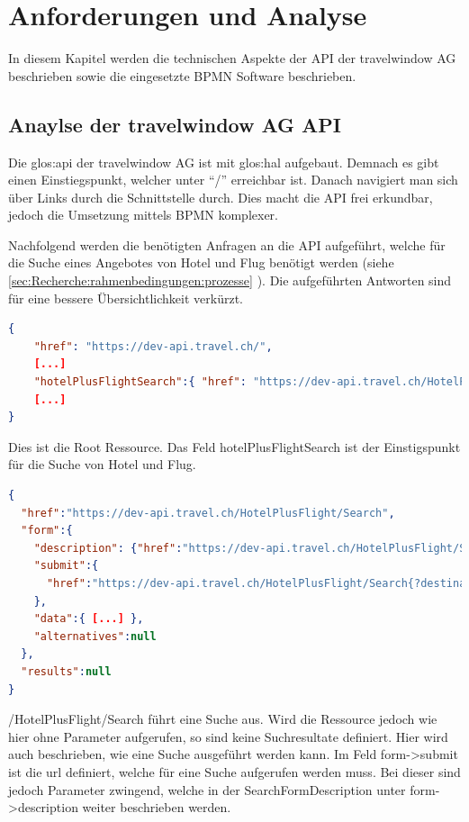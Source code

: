 

\chapter{Anforderungen und Analyse}
\label{sec:analyse}
In diesem Kapitel werden die technischen Aspekte der API der travelwindow AG beschrieben sowie die eingesetzte BPMN Software beschrieben.

\section{Anaylse der travelwindow AG API}
\label{sec:analyse:api}
Die \Gls{glos:api} der travelwindow AG ist mit \Gls{glos:hal} aufgebaut. Demnach es gibt einen Einstiegspunkt, welcher unter "`/"' erreichbar ist. Danach navigiert man sich über Links durch die Schnittstelle durch. Dies macht die API frei erkundbar, jedoch die Umsetzung mittels BPMN komplexer.

Nachfolgend werden die benötigten Anfragen an die API aufgeführt, welche für die Suche eines Angebotes von Hotel und Flug benötigt werden (siehe \cref{sec:Recherche:rahmenbedingungen:prozesse} ). Die aufgeführten Antworten sind für eine bessere Übersichtlichkeit verkürzt.


\begin{lstlisting}[language=json,firstnumber=1]
{
	"href": "https://dev-api.travel.ch/",
	[...]
	"hotelPlusFlightSearch":{ "href": "https://dev-api.travel.ch/HotelPlusFlight/Search" },
	[...]
}
\end{lstlisting}
Dies ist die Root Ressource. Das Feld hotelPlusFlightSearch ist der Einstigspunkt für die Suche von Hotel und Flug.

\begin{lstlisting}[language=json,firstnumber=1]
{
  "href":"https://dev-api.travel.ch/HotelPlusFlight/Search",
  "form":{
    "description": {"href":"https://dev-api.travel.ch/HotelPlusFlight/SearchFormDescription/HotelPlusFlight"},
    "submit":{
      "href":"https://dev-api.travel.ch/HotelPlusFlight/Search{?destination,periodOfStay,roomOccupancies*,departureAirport,departureAirports*,targetPeriodOfStay,hotelCategories*,ratings,mealTypeCategories*,directFlight,flightClasses*,matchHotels,productType}"
    },
    "data":{ [...] },
    "alternatives":null
  },
  "results":null
}
\end{lstlisting}
/HotelPlusFlight/Search führt eine Suche aus. Wird die Ressource jedoch wie hier ohne Parameter aufgerufen, so sind keine Suchresultate definiert.
Hier wird auch beschrieben, wie eine Suche ausgeführt werden kann. Im Feld form->submit ist die \gls{url} definiert, welche für eine Suche aufgerufen werden muss. Bei dieser sind jedoch Parameter zwingend, welche in der SearchFormDescription unter form->description weiter beschrieben werden.

